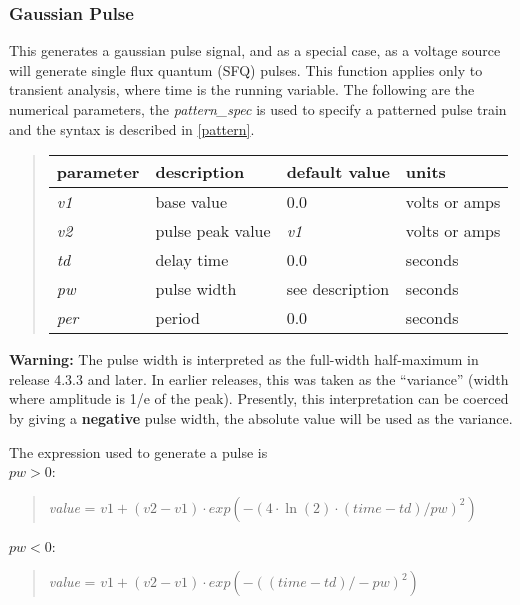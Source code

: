 \subsubsection{Gaussian Pulse}



This generates a gaussian pulse signal, and as a special case, as a
voltage source will generate single flux quantum (SFQ) pulses.  This
function applies only to transient analysis, where time is the running
variable.  The following are the numerical parameters, the {\it
pattern\_spec} is used to specify a patterned pulse train and the
syntax is described in \ref{pattern}.

\begin{quote}
\begin{tabular}{|l|l|l|l|} \hline
{\bf parameter} & {\bf description} & {\bf default value} &
  {\bf units}\\ \hline\hline
{\it v1} & base value & 0.0 & volts or amps\\ \hline
{\it v2} & pulse peak value & {\it v1} & volts or amps\\ \hline
{\it td} & delay time & 0.0 & seconds\\ \hline
{\it pw} & pulse width & see description & seconds\\ \hline
{\it per} & period & 0.0 & seconds\\ \hline
\end{tabular}
\end{quote}

{\bf Warning:} The pulse width is interpreted as the full-width
half-maximum in release 4.3.3 and later.  In earlier releases, this
was taken as the ``variance'' (width where amplitude is 1/e of the
peak).  Presently, this interpretation can be coerced by giving a {\bf
negative} pulse width, the absolute value will be used as the
variance.

The expression used to generate a pulse is\\
$pw > 0$:\\
\begin{quote}
{\it value} = $v1 + (v2 - v1){\cdot}exp(-(4\cdot\ln(2)\cdot(time-td)/pw)^2)$
\end{quote}
$pw < 0$:\\
\begin{quote}
{\it value} = $v1 + (v2 - v1){\cdot}exp(-((time-td)/-pw)^2)$
\end{quote}

